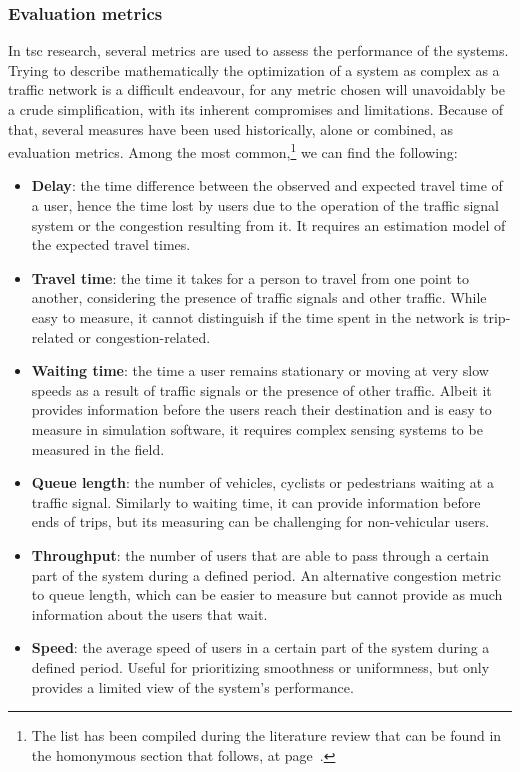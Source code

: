 \subsubsection{Evaluation metrics} \label{subsubsec:eval_metrics}
In \gls{tsc} research, several metrics are used to assess the performance of the systems. Trying to describe mathematically the optimization of a system as complex as a traffic network is a difficult endeavour, for any metric chosen will unavoidably be a crude simplification, with its inherent compromises and limitations. Because of that, several measures have been used historically, alone or combined, as evaluation metrics. Among the most common,\footnote{The list has been compiled during the literature review that can be found in the homonymous section that follows, at page~\pageref{sec:lit_review}.} we can find the following:

\begin{itemize}
  \item \textbf{Delay}: the time difference between the observed and expected travel time of a user, hence the time lost by users due to the operation of the traffic signal system or the congestion resulting from it. It requires an estimation model of the expected travel times.
  \item \textbf{Travel time}: the time it takes for a person to travel from one point to another, considering the presence of traffic signals and other traffic. While easy to measure, it cannot distinguish if the time spent in the network is trip-related or congestion-related.
  \item \textbf{Waiting time}: the time a user remains stationary or moving at very slow speeds as a result of traffic signals or the presence of other traffic. Albeit it provides information before the users reach their destination and is easy to measure in simulation software, it requires complex sensing systems to be measured in the field.
  \item \textbf{Queue length}: the number of vehicles, cyclists or pedestrians waiting at a traffic signal. Similarly to waiting time, it can provide information before ends of trips, but its measuring can be challenging for non-vehicular users.
  \item \textbf{Throughput}: the number of users that are able to pass through a certain part of the system during a defined period. An alternative congestion metric to queue length, which can be easier to measure but cannot provide as much information about the users that wait.
  \item \textbf{Speed}: the average speed of users in a certain part of the system during a defined period. Useful for prioritizing smoothness or uniformness, but only provides a limited view of the system's performance.
\end{itemize}

